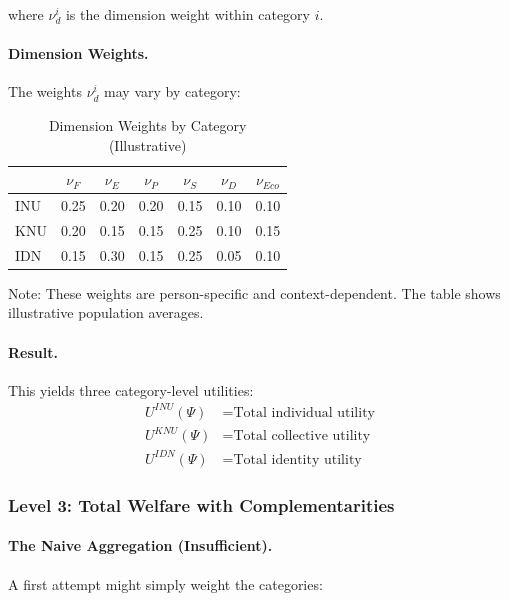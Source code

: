 where $\nu^i_d$ is the dimension weight within category $i$.

\paragraph{Dimension Weights.}
The weights $\nu^i_d$ may vary by category:

\begin{table}[htbp]
\centering
\caption{Dimension Weights by Category (Illustrative)}
\label{tab:dimension-weights}
\renewcommand{\arraystretch}{1.3}
\begin{tabular}{@{}lcccccc@{}}
\toprule
& $\nu_F$ & $\nu_E$ & $\nu_P$ & $\nu_S$ & $\nu_D$ & $\nu_{Eco}$ \\
\midrule
INU & 0.25 & 0.20 & 0.20 & 0.15 & 0.10 & 0.10 \\
KNU & 0.20 & 0.15 & 0.15 & 0.25 & 0.10 & 0.15 \\
IDN & 0.15 & 0.30 & 0.15 & 0.25 & 0.05 & 0.10 \\
\bottomrule
\end{tabular}
\end{table}

Note: These weights are person-specific and context-dependent. The table 
shows illustrative population averages.

\paragraph{Result.}
This yields three category-level utilities:
\begin{align}
U^{INU}(\Psi) &= \text{Total individual utility} \\
U^{KNU}(\Psi) &= \text{Total collective utility} \\
U^{IDN}(\Psi) &= \text{Total identity utility}
\end{align}

\subsubsection{Level 3: Total Welfare with Complementarities}

\paragraph{The Naive Aggregation (Insufficient).}
A first attempt might simply weight the categories:


